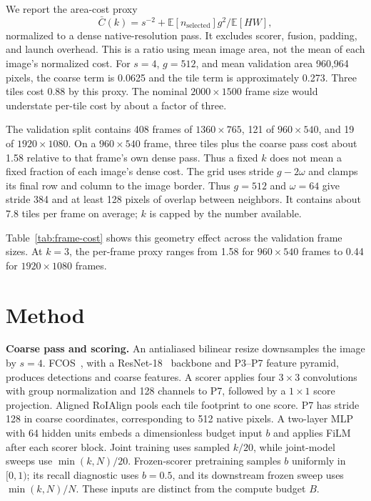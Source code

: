 \documentclass[conference]{IEEEtran}
\begin{document}
We report the area-cost proxy
\begin{equation}
\bar C(k)=s^{-2}+\mathbb E[n_{\mathrm{selected}}]g^2/\mathbb E[HW],
\label{eq:proxy}
\end{equation}
normalized to a dense native-resolution pass. It excludes scorer, fusion, padding, and launch overhead. This is a ratio using mean image area, not the mean of each image's normalized cost. For $s=4$, $g=512$, and mean validation area 960{,}964 pixels, the coarse term is 0.0625 and the tile term is approximately 0.273. Three tiles cost 0.88 by this proxy. The nominal $2000\times1500$ frame size would understate per-tile cost by about a factor of three.

The validation split contains 408 frames of $1360\times765$, 121 of $960\times540$, and 19 of $1920\times1080$. On a $960\times540$ frame, three tiles plus the coarse pass cost about 1.58 relative to that frame's own dense pass. Thus a fixed $k$ does not mean a fixed fraction of each image's dense cost. The grid uses stride $g-2\omega$ and clamps its final row and column to the image border. Thus $g=512$ and $\omega=64$ give stride 384 and at least 128 pixels of overlap between neighbors. It contains about 7.8 tiles per frame on average; $k$ is capped by the number available.

Table~\ref{tab:frame-cost} shows this geometry effect across the validation frame sizes. At $k=3$, the per-frame proxy ranges from 1.58 for $960\times540$ frames to 0.44 for $1920\times1080$ frames.

\section{Method}
\textbf{Coarse pass and scoring.} An antialiased bilinear resize downsamples the image by $s=4$. FCOS~\cite{tian2019fcos}, with a ResNet-18~\cite{he2016resnet} backbone and P3--P7 feature pyramid, produces detections and coarse features. A scorer applies four $3\times3$ convolutions with group normalization and 128 channels to P7, followed by a $1\times1$ score projection. Aligned RoIAlign pools each tile footprint to one score. P7 has stride 128 in coarse coordinates, corresponding to 512 native pixels. A two-layer MLP with 64 hidden units embeds a dimensionless budget input $b$ and applies FiLM after each scorer block. Joint training uses sampled $k/20$, while joint-model sweeps use $\min(k,N)/20$. Frozen-scorer pretraining samples $b$ uniformly in $[0,1)$; its recall diagnostic uses $b=0.5$, and its downstream frozen sweep uses $\min(k,N)/N$. These inputs are distinct from the compute budget $B$.
\end{document}
